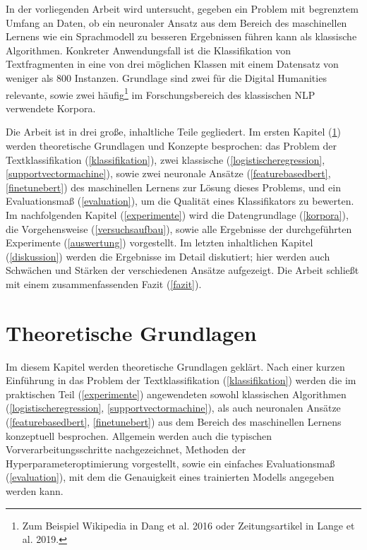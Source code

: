 In der vorliegenden Arbeit wird untersucht, gegeben ein Problem mit begrenztem Umfang an Daten, ob ein neuronaler Ansatz aus dem Bereich des maschinellen Lernens wie ein Sprachmodell zu \hspace{0.4mm}b\hspace{0.4mm}e\hspace{0.4mm}s\hspace{0.4mm}s\hspace{0.4mm}e\hspace{0.4mm}r\hspace{0.4mm}e\hspace{0.4mm}n\hspace{0.4mm} Ergebnissen führen kann als klassische Algorithmen. Konkreter Anwendungsfall ist die Klassifikation von Textfragmenten in eine von drei möglichen Klassen mit einem Datensatz von weniger als 800 Instanzen. Grundlage sind zwei für die Digital 
Humanities relevante, sowie zwei häufig\footnote{Zum Beispiel Wikipedia in Dang et al. 2016 oder Zeitungsartikel in Lange et al. 2019.} im Forschungsbereich des klassischen NLP verwendete Korpora.

Die Arbeit ist in drei große, inhaltliche Teile gegliedert. Im ersten Kapitel (\ref{grundlagen}) werden theoretische Grundlagen 
und Konzepte besprochen: das Problem der Textklassifikation (\ref{klassifikation}), zwei klassische (\ref{logistischeregression}, \ref{supportvectormachine}), sowie 
zwei neuronale Ansätze (\ref{featurebasedbert}, \ref{finetunebert}) des maschinellen Lernens zur Lösung dieses Problems, und ein Evaluationsmaß (\ref{evaluation}), 
um die Qualität eines Klassifikators zu bewerten. Im nachfolgenden Kapitel (\ref{experimente}) wird die Datengrundlage (\ref{korpora}), 
die Vorgehensweise (\ref{versuchsaufbau}), sowie alle Ergebnisse der durchgeführten Experimente (\ref{auswertung}) vorgestellt. 
Im letzten inhaltlichen Kapitel (\ref{diskussion}) werden die Ergebnisse im Detail diskutiert; hier werden auch Schwächen und Stärken 
der verschiedenen Ansätze aufgezeigt. Die Arbeit schließt mit einem zusammenfassenden Fazit (\ref{fazit}).


\chapter{Theoretische Grundlagen}
\label{grundlagen}
Im diesem Kapitel werden theoretische Grundlagen geklärt. Nach einer kurzen Einführung in das Problem der 
Textklassifikation (\ref{klassifikation}) werden die im praktischen Teil (\ref{experimente}) angewendeten sowohl klassischen 
Algorithmen (\ref{logistischeregression}, \ref{supportvectormachine}), als auch neuronalen Ansätze (\ref{featurebasedbert}, \ref{finetunebert}) aus dem Bereich des maschinellen Lernens konzeptuell 
besprochen. Allgemein werden auch die typischen Vorverarbeitungsschritte nachgezeichnet, Methoden der Hyperparameteroptimierung vorgestellt, 
sowie ein einfaches Evaluationsmaß (\ref{evaluation}), mit dem die Genauigkeit eines trainierten Modells angegeben 
werden kann.


